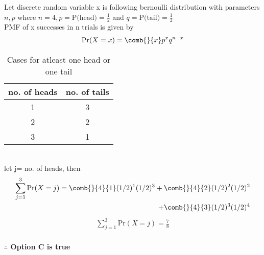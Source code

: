 
Let discrete random variable x is following bernoulli distribution with parameters $n,p$ where $n=4,p=\text{P(head)}=\frac{1}{2}$ and $q=\text{P(tail)}=\frac{1}{2}$\\
PMF of x successes in n trials is given by
\begin{align}
    \text{Pr}(X=x)=\comb{}{x} p^{x}q^{n-x}
\end{align}
\begin{table}[ht]
\caption{Cases for atleast one head or one tail}
\begin{center}
    \begin{tabular}{|c|c|}
    \hline
    no. of heads & no. of tails \\
    \hline
     1 & 3\\
    \hline
     2 & 2\\
     \hline
     3 & 1\\
     \hline
    \end{tabular}
\end{center} 
\end{table}
\\let j= no. of heads, then
\begin{align}
 \sum_{j=1}^{3}\text{Pr}(X=j)=\comb{}{4}{1}(1/2)^{1}(1/2)^{3}+\comb{}{4}{2}(1/2)^{2}(1/2)^{2}\\+\comb{}{4}{3}(1/2)^{3}(1/2)^{4}
\end{align}
\begin{align}
    \sum_{j=1}^{3}\text{Pr}(X=j)=\frac{7}{8}
\end{align}
  \\
\textbf{$\therefore$ Option C is true}